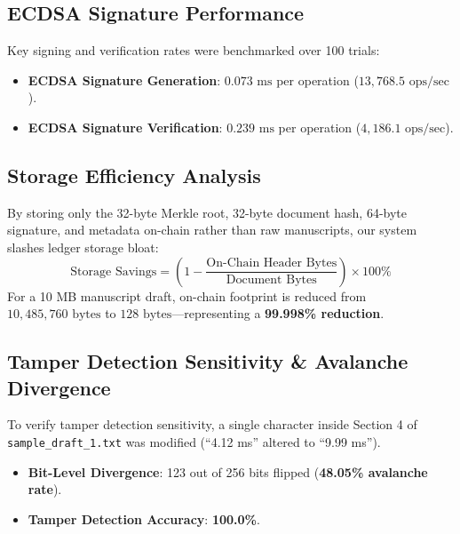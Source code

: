 \documentclass[conference]{IEEEtran}
\begin{document}
\subsection{ECDSA Signature Performance}
Key signing and verification rates were benchmarked over 100 trials:
\begin{itemize}
    \item \textbf{ECDSA Signature Generation}: $0.073 \text{ ms}$ per operation ($13,768.5 \text{ ops/sec}$).
    \item \textbf{ECDSA Signature Verification}: $0.239 \text{ ms}$ per operation ($4,186.1 \text{ ops/sec}$).
\end{itemize}

\subsection{Storage Efficiency Analysis}
By storing only the 32-byte Merkle root, 32-byte document hash, 64-byte signature, and metadata on-chain rather than raw manuscripts, our system slashes ledger storage bloat:
\begin{equation}
\text{Storage Savings} = \left(1 - \frac{\text{On-Chain Header Bytes}}{\text{Document Bytes}}\right) \times 100\%
\end{equation}
For a 10 MB manuscript draft, on-chain footprint is reduced from $10,485,760 \text{ bytes}$ to $128 \text{ bytes}$---representing a \textbf{99.998\% reduction}.

\subsection{Tamper Detection Sensitivity \& Avalanche Divergence}
To verify tamper detection sensitivity, a single character inside Section 4 of \texttt{sample\_draft\_1.txt} was modified (``4.12 ms'' altered to ``9.99 ms'').
\begin{itemize}
    \item \textbf{Bit-Level Divergence}: 123 out of 256 bits flipped (\textbf{48.05\% avalanche rate}).
    \item \textbf{Tamper Detection Accuracy}: \textbf{100.0\%}.
\end{itemize}
\end{document}
